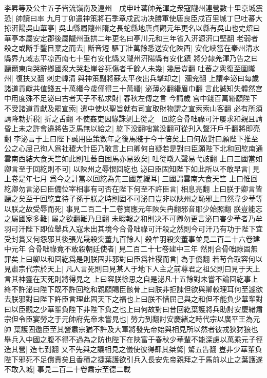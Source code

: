李昇等及公主五子皆流嶺南及遠州　戊申吐蕃帥羌渾之衆寇隴州連營數十里京城震恐|{
	帥讀曰率}
九月丁卯遣神策將石季章戍武功决勝軍使唐良臣戍百里城丁巳吐蕃大掠汧陽吳山華亭|{
	吳山縣屬隴州隋之長蛇縣地唐貞觀元年更名以縣有吳山也史炤曰華亭本屬安定郡後屬隴州垂拱二年更名曰亭川元和三年省入汧源汧口堅翻}
老弱者殺之或斷手鑿目棄之而去|{
	斷音短}
驅丁壯萬餘悉送安化陜西|{
	安化峽當在秦州清水縣界九域志平凉西南七十里冇安化縣又隴州汧陽縣有安化鎮}
將分隸羌渾乃告之曰聽爾東向哭辭鄉國衆大哭赴崖谷死傷者千餘人未幾|{
	幾居豈翻}
吐蕃之衆復至圍隴州|{
	復扶又翻}
刺史韓清與神策副將蘇太平夜出兵擊却之|{
	瀰兖翻}
上謂李泌曰每歲諸道貢獻共值錢五十萬緡今歲僅得三十萬緡|{
	泌薄必翻緡眉巾翻}
言此誠知失體然宫中用度殊不足泌曰古者天子不私求財|{
	春秋左傳之言}
今請歲宫中錢百萬緡願陛下不受諸道貢獻及罷宣索|{
	遣中使以聖旨就有司宣取財物謂之宣索索山客翻}
必有所須請降勅折税|{
	折之舌翻}
不使姦吏因緣誅剝上從之　回紇合骨咄祿可汗屢求和親且請昏上未之許會邉將告乏馬無以給之|{
	紇下没翻咄當没翻可從刋入聲汗戶千翻將即亮翻}
李泌言于上曰陛下誠用臣策數年之後馬賤于今十倍矣上曰何故對曰願陛下推至公之心屈己徇人爲社稷大計臣乃敢言上曰卿何自疑若是對曰臣願陛下北和回紇南通雲南西結大食天竺如此則吐蕃自困馬亦易致矣|{
	吐從暾入聲易弋豉翻}
上曰三國當如卿言至于回紇則不可|{
	以陜州之辱恨回紇也}
泌曰臣固知陛下如此所以不敢早言|{
	見上卷是年七月}
爲今之計當以回紇為先三國差緩耳|{
	三國謂雲南大食天竺}
上曰惟回紇卿勿言泌曰臣備位宰相事有可否在陛下何至不許臣言|{
	相息亮翻}
上曰朕于卿言皆聽之矣至于回紇宜待子孫于朕之時則固不可泌曰豈非以陜州之恥邪上曰然韋少華等以朕之故受辱而死|{
	事見二百二十二卷寶應元年陜失冉翻邪音耶少始照翻}
朕豈能忘之屬國家多難|{
	屬之欲翻難乃旦翻}
未暇報之和則决不可卿勿更言泌曰害少華者乃牟羽可汗陛下即位舉兵入寇未出其境今合骨咄祿可汗殺之然則今可汗乃有功于陛下宜受封賞又何怨邪其後張光晟殺突董九百餘人|{
	殺牟羽殺突董事並見二百二十六卷建中元年}
合骨咄祿竟不敢殺朝廷使者|{
	見二百二十七卷建中三年}
然則合骨咄祿固無罪矣上曰卿以和回紇爲是則朕固非邪對曰臣爲社稷而言|{
	為于僞翻}
若苟合取容何以見肅宗代宗於天上|{
	凡人言死則曰見某人于地下人主之前尊君之祖父則曰見于天上言其神靈在天死則將得見之}
上曰容朕徐思之自是泌凡十五餘對未嘗不論回紇事上終不許泌曰陛下既不許回紇和親願賜臣骸骨上曰朕非拒諫但欲與卿較理耳何至遽欲去朕邪對曰陛下許臣言理此固天下之福也上曰朕不惜屈己與之和但不能負少華輩對曰以臣觀之少華輩負陛下非陛下負之也上曰何故對曰昔回紇葉護將兵助討安慶緒肅宗但令臣宴勞之于元帥府先帝未嘗見也|{
	勞力到翻討安慶緒之時代宗以廣平王為元帥}
葉護固邀臣至其營肅宗猶不許及大軍將發先帝始與相見所以然者彼戎狄犲狼也舉兵入中國之腹不得不過為之防也陛下在陜富于春秋少華輩不能深慮以萬乘元子徑造其營|{
	造七到翻}
又不先與之議相見之儀使彼得肆其桀驁|{
	驁五告翻}
豈非少華輩負陛下邪死不足償責矣且香積之捷葉護欲引兵入長安先帝親拜之于馬前以止之葉護遂不敢入城|{
	事見二百二十卷肅宗至德二載}
